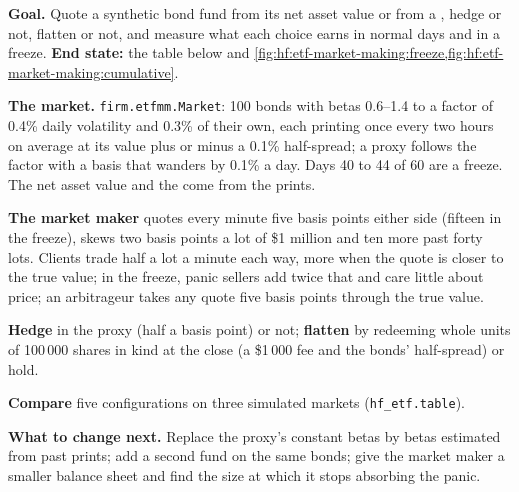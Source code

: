 \begin{tutorial}
\textbf{Goal.} Quote a synthetic bond fund from its net asset value or from a , hedge or not, flatten or not, and measure what each
choice earns in normal days and in a freeze. \textbf{End state:} the table below and \cref{fig:hf:etf-market-making:freeze,fig:hf:etf-market-making:cumulative}.
\begin{tutsteps}
\item \textbf{The market.} \texttt{firm.etfmm.Market}: 100 bonds with betas 0.6--1.4 to a factor of 0.4\% daily volatility and 0.3\% of their own,
each printing once every two hours on average at its value plus or minus a 0.1\% half-spread; a proxy follows the factor with a basis that wanders by
0.1\% a day. Days 40 to 44 of 60 are a freeze. The net asset value and the  come from the prints.
\label{lst:hf:etf-market-making:market}
\item \textbf{The market maker} quotes every minute five basis points either side (fifteen in the freeze), skews two basis points a lot of
\$1 million and ten more past forty lots. Clients trade half a lot a minute each way, more when the quote is closer to the true value; in the freeze,
panic sellers add twice that and care little about price; an arbitrageur takes any quote five basis points through the true value.
\label{lst:hf:etf-market-making:quote}
\item \textbf{Hedge} in the proxy (half a basis point) or not; \textbf{flatten} by redeeming whole units of 100\,000 shares in kind at the close
(a \$1\,000 fee and the bonds' half-spread) or hold.
\item \textbf{Compare} five configurations on three simulated markets (\texttt{hf\_etf.table}).
\end{tutsteps}
\textbf{What to change next.} Replace the proxy's constant betas by betas estimated from past prints; add a second fund on the same bonds; give the
market maker a smaller balance sheet and find the size at which it stops absorbing the panic.
\end{tutorial}

